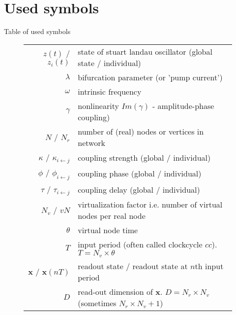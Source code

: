 \clearpage
\section{Used symbols}
Table of used symbols
	\begin{figure}[!h]
		\centering
		\begin{tabular}{ r | l }
			$z(t)$ / $z_{i}(t)$ & state of stuart landau oscillator (global state / individual) \\[10pt]
			
			$\lambda$ & bifurcation parameter (or 'pump current') \\
			$\omega$ & intrinsic frequency \\
			$\gamma$ & nonlinearity $Im(\gamma)$ - amplitude-phase coupling) \\[10pt]
			
			
			$N$ / $N_r$ & number of (real) nodes or vertices in network \\
			$\kappa$ / $\kappa_{i\leftarrow j}$ & coupling strength (global / individual)\\
			$\phi$ / $\phi_{i\leftarrow j}$ & coupling phase (global / individual) \\
			$\tau$ / $\tau_{i \leftarrow j}$ & coupling delay (global / individual) \\[10pt]			
			
			
			$N_v$ / $vN$ & virtualization factor i.e. number of virtual nodes per real node\\						
			$\theta$ & virtual node time \\
			$T$ & input period (often called clockcycle $cc$). $T=N_v \times \theta$\\
			$\textbf{x}$ / $\textbf{x}(nT)$ & readout state / readout state at $n$th input period\\			
			$D$ & read-out dimension of $\textbf{x}$. $D=N_r \times N_v$ (sometimes $N_r \times N_v + 1$)\\[10pt]
			

\end{tabular}
\end{figure}
